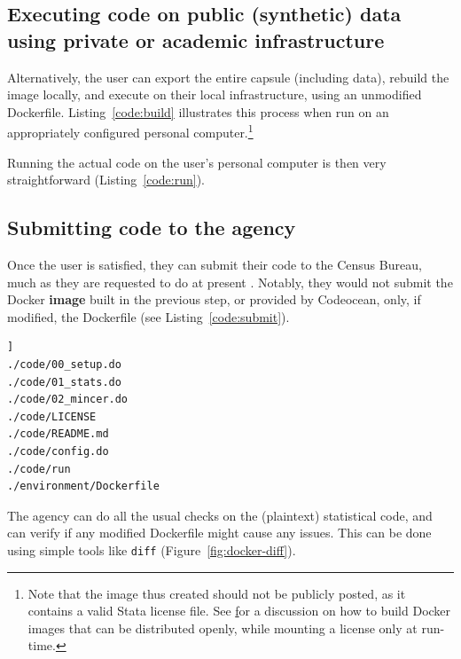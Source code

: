 \documentclass[inline]{hdsr}
\begin{document}
\subsection{Executing code on public (synthetic) data using private or academic infrastructure}

Alternatively, the user can export the entire capsule (including data), rebuild the image locally, and execute on their local infrastructure, using an unmodified Dockerfile. Listing~\ref{code:build} illustrates this process when run on an appropriately configured personal computer.\footnote{Note that the image thus created should not be publicly posted, as it contains a valid Stata license file. See \href{https://github.com/AEADataEditor/docker-stata} for a discussion on how to build Docker images that can be distributed openly, while mounting a license only at run-time.}


%

\noindent Running the actual code on the user's personal computer is then very straightforward (Listing~\ref{code:run}).






\subsection{Submitting code to the agency}

Once the user is satisfied, they can submit their code to the Census Bureau, much as they are requested to do at present \citep{u.s.censusbureauSIPPSyntheticBeta2015b}. Notably, they would not submit the Docker \textbf{image} built in the previous step, or provided by Codeocean, only, if modified, the Dockerfile (see Listing~\ref{code:submit}).

\begin{lstlisting}[language=bash, caption=Submitted files,basicstyle=\footnotesize\color{NavyBlue}\ttfamily,label={code:submit}]]
./code/00_setup.do
./code/01_stats.do
./code/02_mincer.do
./code/LICENSE
./code/README.md
./code/config.do
./code/run
./environment/Dockerfile
\end{lstlisting}


The agency can do all the usual checks on the (plaintext) statistical code, and can verify if any modified Dockerfile might cause any issues. This can be done using simple tools like \texttt{diff} (Figure~\ref{fig:docker-diff}).
\end{document}
